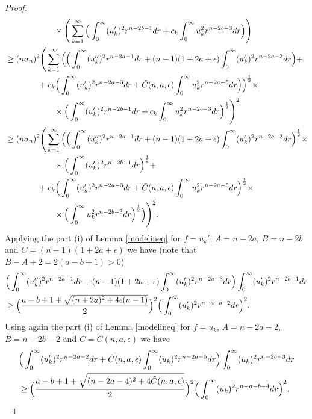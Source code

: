 \documentclass[a4paper,12pt]{article}
\theoremstyle{plain}
\theoremstyle{definition}
\theoremstyle{remark}
\def\ep{\epsilon}%
\numberwithin{equation}{section}
\begin{document}
\begin{proof}
\begin{align}
&\qquad\qquad \qquad \times \Bigg(\sum_{k=1}^\infty\Big(\int_0^\infty (u_k')^2 r^{n-2b -1} dr + c_k \int_0^\infty u_k^2 r^{n -2b -3} dr\Big)\Bigg)\notag\\
&\geq (n\sigma_n)^2 \Bigg(\sum_{k=1}^\infty\Big(\Big(\int_0^\infty (u_k'')^2 r^{n-2a -1} dr + (n-1)(1+2a+\epsilon)\int_0^\infty (u_k')^2 r^{n-2a -3} dr\Big) +\notag\\
&\qquad\qquad +c_k\Big(\int_0^\infty (u_k')^2 r^{n-2a -3} dr +  \tilde{C}(n,a,\epsilon)\int_0^\infty u_k^2 r^{n -2a -5} dr\Big)\Big)^{\frac12}\times \notag\\
&\qquad\qquad\qquad \times \Big(\int_0^\infty (u_k')^2 r^{n-2b -1} dr + c_k \int_0^\infty u_k^2 r^{n -2b -3} dr\Big)^{\frac12}\Bigg)^2\notag\\
&\geq (n\sigma_n)^2 \Bigg(\sum_{k=1}^\infty\Big(\Big(\int_0^\infty (u_k'')^2 r^{n-2a -1} dr + (n-1)(1+2a+\epsilon)\int_0^\infty (u_k')^2 r^{n-2a -3} dr\Big)^{\frac12} \times\notag\\
&\qquad\qquad\qquad \times \Big(\int_0^\infty (u_k')^2 r^{n-2b -1} dr\Big)^{\frac12}+ \notag\\
&\qquad\qquad + c_k\Big(\int_0^\infty (u_k')^2 r^{n-2a -3} dr +  \tilde{C}(n,a,\epsilon)\int_0^\infty u_k^2 r^{n -2a -5} dr\Big)^{\frac12} \times\notag\\
&\qquad\qquad\qquad \times\Big(\int_0^\infty u_k^2 r^{n -2b -3} dr\Big)^{\frac12}\Big) \Bigg)^2.
\end{align}
Applying the part (i) of Lemma \ref{modelineq} for $f = u_k'$, $A = n-2a$, $B =n-2b$ and $C = (n-1)(1 + 2a +\epsilon)$ we have (note that $B-A +2 = 2(a-b +1) >0$)
\begin{align*}
&\Big(\int_0^\infty (u_k'')^2 r^{n-2a -1} dr + (n-1)(1+2a+\epsilon)\int_0^\infty (u_k')^2 r^{n-2a -3} dr\Big)\int_0^\infty (u_k')^2 r^{n-2b -1} dr\notag\\
&\geq \Big(\frac{a-b+1 + \sqrt{(n+2a)^2 + 4\ep(n-1)}}2\Big)^2 \Big(\int_0^\infty (u_k')^2 r^{n-a-b -2} dr\Big)^2.
\end{align*}
Using again the part (i) of Lemma \ref{modelineq} for $f = u_k$, $A = n-2a-2$, $B =n-2b-2$ and $C = \tilde C(n,a,\epsilon)$ we have
\begin{align*}
&\Big(\int_0^\infty (u_k')^2 r^{n-2a -2} dr +  \tilde{C}(n,a,\epsilon)\int_0^\infty (u_k)^2 r^{n-2a -5} dr\Big)\int_0^\infty (u_k)^2 r^{n-2b -3} dr\notag\\
&\geq \Big(\frac{a-b+1 + \sqrt{(n-2a-4)^2 + 4 \tilde{C}(n,a,\epsilon)}}2\Big)^2 \Big(\int_0^\infty (u_k)^2 r^{n-a-b -4} dr\Big)^2.
\end{align*}

\end{proof}
\end{document}
